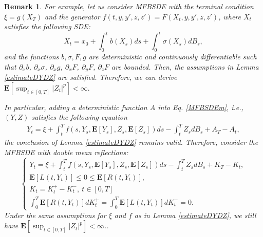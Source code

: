 \documentclass[10pt]{article}%
\numberwithin{equation}{section}
\newtheorem{remark}[theorem]{Remark}
\begin{document}
\begin{remark}
 For example, let us consider MFBSDE with the terminal condition $\xi=g(X_T)$ and the   generator $f(t,y,y',z,z')=F(X_t,y,y',z,z')$, where $X_t$ satisfies the following SDE:
    \begin{equation*}
        X_t=x_0+\int_{0}^{t}b(X_s)ds+\int_{0}^{t}\sigma(X_s)dB_s,
    \end{equation*}
 and the functions $b,\sigma,F,g$ are deterministic and continuously differentiable such that $\partial_xb$, $\partial_{x}\sigma$,  $\partial_{x}g$, $\partial_{x}F$,  $\partial_{y}F$, $\partial_{z}F$ are bounded. Then, the assumptions in Lemma \ref{estimateDYDZ} are satisfied. Therefore, we can derive 
  $\mathbf{E}\left[\sup_{t\in[0,T]}\left|Z_t\right|^p\right]<\infty.$ 
  
In particular, adding a deterministic function $A$ into Eq. \eqref{MFBSDEm}, i.e., $(Y,Z)$ satisfies the following equation
\begin{align*}
    Y_t=\xi+\int_t^T f(s,Y_s,\mathbf{E}[Y_s],Z_s,\mathbf{E}[Z_s])ds-\int_t^T Z_s dB_s+A_T-A_t,
\end{align*}
the conclusion of Lemma \ref{estimateDYDZ} remains valid. Therefore, consider the MFBSDE with double mean reflections:
\begin{equation}\label{EMFBSDE}
\begin{cases}
Y_t=\xi+\int_t^T f(s,Y_s,\mathbf{E}[Y_s],Z_s,\mathbf{E}[Z_s])ds-\int_t^T Z_s dB_s+K_T-K_t, \\
\mathbf{E}[L(t,Y_t)]\leq 0\leq \mathbf{E}[R(t,Y_t)],\\ 
{K_t=K^+_t-K^-_t, \ t\in[0,T]}\\
\int_0^T \mathbf{E}[R(t,Y_t)]dK^+_t=\int_0^T \mathbf{E}[L(t,Y_t)]dK^-_t=0. 
\end{cases}
\end{equation}
Under the same assumptions for $\xi$ and $f$ as in Lemma \ref{estimateDYDZ}, we still have $\mathbf{E}\left[\sup_{t\in[0,T]}\left|Z_t\right|^p\right]<\infty$.. %
 \end{remark}
   
\end{document}
